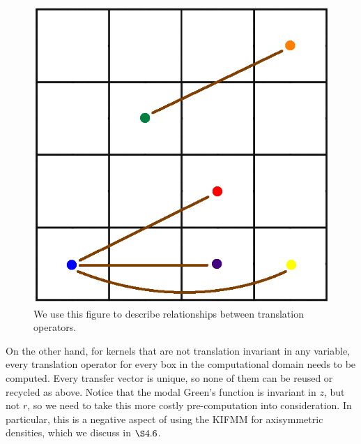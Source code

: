 \documentclass[11pt, oneside]{article}   	%
\begin{document}
\begin{figure}[h]
\caption{We use this figure to describe relationships between translation operators.}
\label{fig:7}
\centering
\includegraphics[scale=0.25]{./images/M2L}
\end{figure}

On the other hand, for kernels that are not translation invariant in any variable, every translation operator for every box in the computational domain needs to be computed. Every transfer vector is unique, so none of them can be reused or recycled as above. Notice that the modal Green's function is invariant in $z$, but not $r$, so we need to take this more costly pre-computation into consideration. In particular, this is a negative aspect of using the KIFMM for axisymmetric densities, which we discuss in $\S4.6$.
\end{document}
